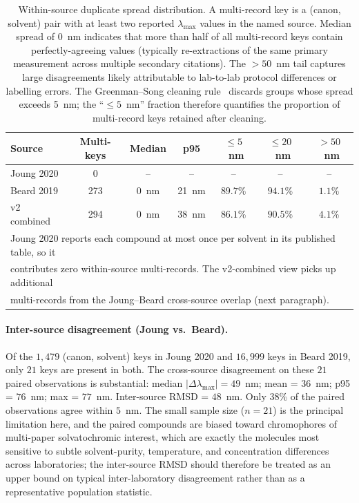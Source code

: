 \documentclass[journal=jcisd8,manuscript=suppinfo]{achemso}
\begin{document}
\begin{table}[htbp]
\centering
\caption{Within-source duplicate spread distribution. A multi-record key is a (canon, solvent) pair with at least two reported $\lambda_{\max}$ values in the named source. Median spread of $0$~nm indicates that more than half of all multi-record keys contain perfectly-agreeing values (typically re-extractions of the same primary measurement across multiple secondary citations). The $> 50$~nm tail captures large disagreements likely attributable to lab-to-lab protocol differences or labelling errors. The Greenman--Song cleaning rule~\cite{greenman2022multifidelity,song2025fluortools} discards groups whose spread exceeds 5~nm; the ``$\leq 5$~nm'' fraction therefore quantifies the proportion of multi-record keys retained after cleaning.}
\label{tab:si_uncertainty_within}
\small
\begin{tabular}{lcccccc}
\toprule
\textbf{Source} & \textbf{Multi-keys} & \textbf{Median} & \textbf{p95} & \textbf{$\leq 5$~nm} & \textbf{$\leq 20$~nm} & \textbf{$> 50$~nm} \\
\midrule
Joung 2020 & 0 & -- & -- & -- & -- & -- \\
Beard 2019 & 273 & 0~nm & 21~nm & $89.7$\% & $94.1$\% & $1.1$\% \\
v2 combined & 294 & 0~nm & 38~nm & $86.1$\% & $90.5$\% & $4.1$\% \\
\bottomrule
\multicolumn{7}{l}{\footnotesize Joung 2020 reports each compound at most once per solvent in its published table, so it} \\
\multicolumn{7}{l}{\footnotesize contributes zero within-source multi-records. The v2-combined view picks up additional} \\
\multicolumn{7}{l}{\footnotesize multi-records from the Joung--Beard cross-source overlap (next paragraph).} \\
\end{tabular}
\end{table}

\paragraph{Inter-source disagreement (Joung vs.\ Beard).}
Of the $1{,}479$ (canon, solvent) keys in Joung 2020 and $16{,}999$ keys in Beard 2019, only $21$ keys are present in both. The cross-source disagreement on these $21$ paired observations is substantial: median $|\Delta\lambda_{\max}| = 49$~nm; mean = $36$~nm; p95 = $76$~nm; max = $77$~nm. Inter-source RMSD = $48$~nm. Only $38$\% of the paired observations agree within $5$~nm. The small sample size ($n = 21$) is the principal limitation here, and the paired compounds are biased toward chromophores of multi-paper solvatochromic interest, which are exactly the molecules most sensitive to subtle solvent-purity, temperature, and concentration differences across laboratories; the inter-source RMSD should therefore be treated as an upper bound on typical inter-laboratory disagreement rather than as a representative population statistic.
\end{document}
